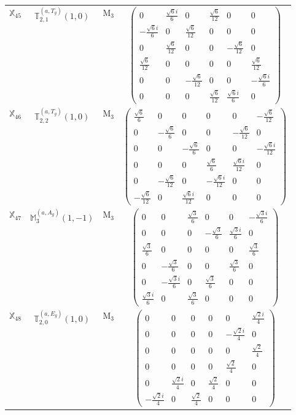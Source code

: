 \documentclass[fleqn,10pt,landscape]{article}
\begin{document}
\begin{itemize}
\begin{center}
\begin{longtable}{c|c|c|c}
$ \mathbb{X}_{45} $ & $\mathbb{T}_{2,1}^{(a,T_{g})}(1,0)$ & M$_{3}$ & $\begin{pmatrix} 0 & \frac{\sqrt{6} i}{6} & 0 & \frac{\sqrt{6}}{12} & 0 & 0 \\ - \frac{\sqrt{6} i}{6} & 0 & \frac{\sqrt{6}}{12} & 0 & 0 & 0 \\ 0 & \frac{\sqrt{6}}{12} & 0 & 0 & - \frac{\sqrt{6}}{12} & 0 \\ \frac{\sqrt{6}}{12} & 0 & 0 & 0 & 0 & \frac{\sqrt{6}}{12} \\ 0 & 0 & - \frac{\sqrt{6}}{12} & 0 & 0 & - \frac{\sqrt{6} i}{6} \\ 0 & 0 & 0 & \frac{\sqrt{6}}{12} & \frac{\sqrt{6} i}{6} & 0 \end{pmatrix}$ \\
$ \mathbb{X}_{46} $ & $\mathbb{T}_{2,2}^{(a,T_{g})}(1,0)$ & M$_{3}$ & $\begin{pmatrix} \frac{\sqrt{6}}{6} & 0 & 0 & 0 & 0 & - \frac{\sqrt{6}}{12} \\ 0 & - \frac{\sqrt{6}}{6} & 0 & 0 & - \frac{\sqrt{6}}{12} & 0 \\ 0 & 0 & - \frac{\sqrt{6}}{6} & 0 & 0 & - \frac{\sqrt{6} i}{12} \\ 0 & 0 & 0 & \frac{\sqrt{6}}{6} & \frac{\sqrt{6} i}{12} & 0 \\ 0 & - \frac{\sqrt{6}}{12} & 0 & - \frac{\sqrt{6} i}{12} & 0 & 0 \\ - \frac{\sqrt{6}}{12} & 0 & \frac{\sqrt{6} i}{12} & 0 & 0 & 0 \end{pmatrix}$ \\
$ \mathbb{X}_{47} $ & $\mathbb{M}_{3}^{(a,A_{g})}(1,-1)$ & M$_{3}$ & $\begin{pmatrix} 0 & 0 & \frac{\sqrt{3}}{6} & 0 & 0 & - \frac{\sqrt{3} i}{6} \\ 0 & 0 & 0 & - \frac{\sqrt{3}}{6} & \frac{\sqrt{3} i}{6} & 0 \\ \frac{\sqrt{3}}{6} & 0 & 0 & 0 & 0 & \frac{\sqrt{3}}{6} \\ 0 & - \frac{\sqrt{3}}{6} & 0 & 0 & \frac{\sqrt{3}}{6} & 0 \\ 0 & - \frac{\sqrt{3} i}{6} & 0 & \frac{\sqrt{3}}{6} & 0 & 0 \\ \frac{\sqrt{3} i}{6} & 0 & \frac{\sqrt{3}}{6} & 0 & 0 & 0 \end{pmatrix}$ \\
$ \mathbb{X}_{48} $ & $\mathbb{T}_{2,0}^{(a,E_{g})}(1,0)$ & M$_{3}$ & $\begin{pmatrix} 0 & 0 & 0 & 0 & 0 & \frac{\sqrt{2} i}{4} \\ 0 & 0 & 0 & 0 & - \frac{\sqrt{2} i}{4} & 0 \\ 0 & 0 & 0 & 0 & 0 & \frac{\sqrt{2}}{4} \\ 0 & 0 & 0 & 0 & \frac{\sqrt{2}}{4} & 0 \\ 0 & \frac{\sqrt{2} i}{4} & 0 & \frac{\sqrt{2}}{4} & 0 & 0 \\ - \frac{\sqrt{2} i}{4} & 0 & \frac{\sqrt{2}}{4} & 0 & 0 & 0 \end{pmatrix}$ \\

\end{longtable}
\end{center}
\end{itemize}
\end{document}
